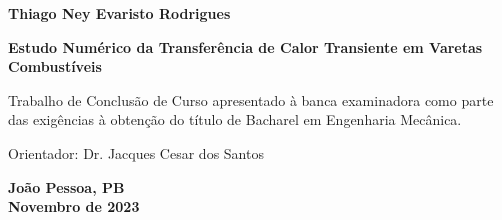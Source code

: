 \begin{titlepage}
    \begin{center}
        {\large
        \textbf{Thiago Ney Evaristo Rodrigues \\}}
        
        \vspace{5cm}
        
        {\Large
        \textbf{Estudo Numérico da Transferência de Calor Transiente em Varetas Combustíveis}}
    \end{center}
        
    \vspace{5cm}
    
    \hfill\begin{minipage}{0.60\textwidth}
        {\large
        Trabalho de Conclusão de Curso apresentado à banca examinadora como parte das exigências à obtenção do título de Bacharel em Engenharia Mecânica.}
        
        \vspace{1cm}
        
        {\large
        Orientador: Dr. Jacques Cesar dos Santos}
    \end{minipage}
        
    \vspace{4cm}
        
    \begin{center}     
        {\large
        \textbf{João Pessoa, PB \\
        Novembro de 2023 \\}}
    \end{center}
\end{titlepage}